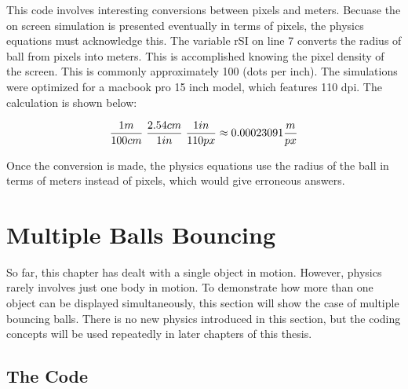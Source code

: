 This code involves interesting conversions between pixels and meters.  Becuase the on screen simulation is presented eventually in terms of pixels, the physics equations must acknowledge this.  The variable rSI on line 7 converts the radius of ball from pixels into meters.  This is accomplished knowing the pixel density of the screen.  This is commonly approximately 100 (dots per inch).  The simulations were optimized for a macbook pro 15 inch model, which features 110 dpi.  The calculation is shown below:

\begin{equation}\label{eq:pixels}
\frac{1m}{100 cm} \hspace{1mm} \frac{2.54 cm}{1 in}  \hspace{1mm}   \frac{1 in}{110 px} \approx  0.00023091 \frac{m}{px}
\end{equation}

Once the conversion is made, the physics equations use the radius of the ball in terms of meters instead of pixels, which would give erroneous answers.

\section{Multiple Balls Bouncing}

So far, this chapter has dealt with a single object in motion.  However, physics rarely involves just one body in motion.  To demonstrate how more than one object can be displayed simultaneously, this section will show the case of multiple bouncing balls.  There is no new physics introduced in this section, but the coding concepts will be used repeatedly in later chapters of this thesis.

\subsection{The Code}

































